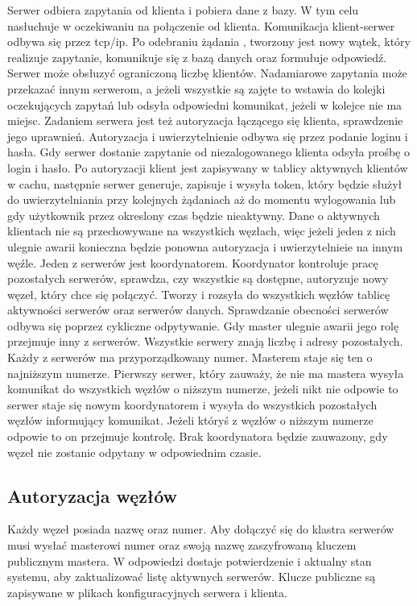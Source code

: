 Serwer odbiera zapytania od klienta i pobiera dane z bazy. W tym celu nasłuchuje w oczekiwaniu na połączenie od klienta. Komunikacja klient-serwer odbywa się przez tcp/ip. Po odebraniu żądania , tworzony jest nowy wątek, który realizuje zapytanie, komunikuje się z bazą danych oraz formułuje odpowiedź. Serwer może obsłuzyć ograniczoną liczbę klientów. Nadamiarowe zapytania może przekazać innym serwerom, a jeżeli wszystkie są zajęte to wstawia do kolejki oczekujących zapytań lub odsyła odpowiedni komunikat, jeżeli w kolejce nie ma miejsc.
Zadaniem serwera jest też autoryzacja łączącego się klienta, sprawdzenie jego uprawnień. Autoryzacja i uwierzytelnienie odbywa się przez podanie loginu i hasła. Gdy serwer dostanie zapytanie od niezalogowanego klienta odsyła prośbę o login i hasło. Po autoryzacji klient jest zapisywany w tablicy aktywnych klientów w cachu, następnie serwer generuje, zapisuje i wysyła token, który będzie służył do uwierzytelniania przy kolejnych żądaniach aż do momentu wylogowania lub gdy użytkownik przez okreslony czas będzie nieaktywny. Dane o aktywnych klientach nie są przechowywane na wszystkich węzłach, więc jeżeli jeden z nich ulegnie awarii konieczna będzie ponowna autoryzacja i uwierzytelnieie na innym węźle.
Jeden z serwerów jest koordynatorem. Koordynator kontroluje pracę pozostałych serwerów, sprawdza, czy wszystkie są dostępne, autoryzuje nowy węzeł, który chce się połączyć. Tworzy i rozsyła do wszystkich węzłów tablicę aktywności serwerów oraz serwerów danych. Sprawdzanie obecności serwerów odbywa się poprzez cykliczne odpytywanie.
Gdy master ulegnie awarii jego rolę przejmuje inny z serwerów.
Wszystkie serwery znają liczbę i adresy pozostałych. Każdy z serwerów ma przyporządkowany numer. Masterem staje się ten o najniższym numerze. Pierwszy serwer, który zauważy, że nie ma mastera wysyła komunikat do wszystkich węzłów o niższym numerze, jeżeli nikt nie odpowie to serwer staje się nowym koordynatorem i wysyła do wszystkich pozostałych węzłów informujący komunikat. Jeżeli któryś z węzłów o niższym numerze odpowie to on przejmuje kontrolę. Brak koordynatora będzie zauwazony, gdy węzeł nie zostanie odpytany w odpowiednim czasie.

\subsection{Autoryzacja węzłów}
Każdy węzeł posiada nazwę oraz numer. Aby dołączyć się do klastra serwerów musi wysłać masterowi numer oraz swoją nazwę zaszyfrowaną kluczem publicznym mastera. W odpowiedzi dostaje potwierdzenie i aktualny stan systemu, aby zaktualizować listę aktywnych serwerów.  Klucze publiczne są zapisywane w plikach konfiguracyjnych serwera i klienta.

